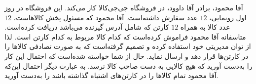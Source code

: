 \EXERCISE
آقا محمود، برادر آقا داوود، در فروشگاه جی‌جی‌کالا کار می‌کند. این فروشگاه در روز اول رونمایی،
$12$
عدد سفارش داشته‌است. آقا محمود که مسئول پخش کالاهاست،
$12$
عدد کالا به همراه
$12$
کارتن که شامل آدرس گیرنده می‌باشد دریافت کرده‌است. متاسفانه آقا محمود فراموش کرده‌است که کدام کالا مربوط به کدام کارتن است. لذا از توان مدیریتی خود استفاده کرده و تصمیم گرفته‌است که به صورت تصادفی کالاها را در کارتن‌ها قرار دهد و ارسال نماید. حال از شما خواسته شده‌است که احتمال این کار را به‌دست آورید که هیچ کالایی به دست صاحب کالا نرسد. به عبارت دیگر احتمال این‌که آقا محمود تمام کالاها را در کارتن‌های اشتباه گذاشته باشد را به‌دست آورید.